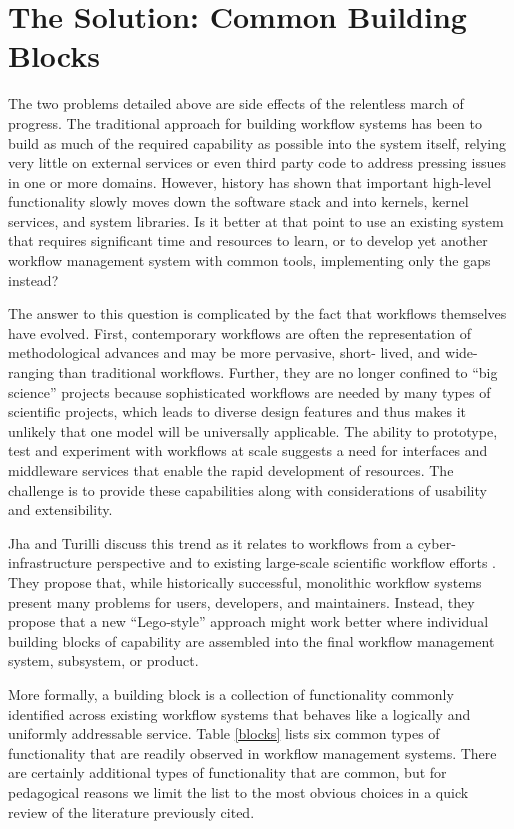 \section{The Solution: Common Building Blocks}\label{buildings-blocks}

The two problems detailed above are side effects of the relentless march of
progress. The traditional approach for building workflow systems has been to
build as much of the required capability as possible into the system itself,
relying very little on external services or even third party code to address
pressing issues in one or more domains. However, history has shown that
important high-level functionality slowly moves down the software stack and
into kernels, kernel services, and system libraries. Is it better at that
point to use an existing system that requires significant time and resources
to learn, or to develop yet another workflow management system with common
tools, implementing only the gaps instead?

The answer to this question is complicated by the fact that workflows
themselves have evolved. First, contemporary workflows are often the
representation of methodological advances and may be more pervasive,  short-
lived, and wide-ranging than traditional workflows. Further, they are no longer
confined to ``big science'' projects because sophisticated workflows are needed
by many types of scientific projects, which leads to diverse design features and thus
makes it unlikely that one model will be universally applicable.  The ability to prototype, test
and experiment with workflows at scale suggests a need for interfaces and
middleware services that enable the rapid development of resources. The
challenge is to provide these capabilities along with considerations of
usability and extensibility.

Jha and Turilli discuss this trend as it relates to workflows from a 
cyber-infrastructure perspective and to existing large-scale scientific workflow
efforts \cite{jha_building_2016}. They propose that, while historically
successful, monolithic workflow systems present many problems for users,
developers, and maintainers. Instead, they propose that a new ``Lego-style''
approach might work better where individual building blocks of capability
are assembled into the final workflow management system, subsystem, or
product.

More formally, a building block is a collection of functionality commonly
identified across existing workflow systems that behaves like a logically and
uniformly addressable service. Table \ref{blocks} lists six common types of
functionality that are readily observed in workflow management systems. There
are certainly additional types of functionality that are common, but for
pedagogical reasons we limit the list to the most obvious choices in a quick review of the literature previously cited.

